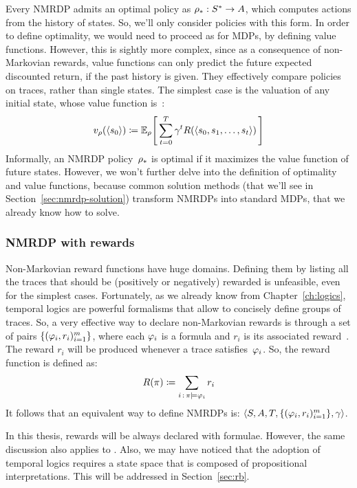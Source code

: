Every NMRDP admits an optimal policy as ${{\rho}_*: S^* \to A}$, which
computes actions from the history of states. So, we'll only consider policies
with this form. In order to define optimality, we would need to proceed as for
MDPs, by defining value functions. However, this is sightly more complex,
since as a consequence of non-Markovian rewards, value functions can
only predict the future expected discounted return, if the past history is
given. They effectively compare policies on traces, rather than single
states. The simplest case is the valuation of any initial state, whose value
function is~\cite{bib:nmrdp-logic-first}:
\begin{equation}
	v_{\rho}(\langle s_0 \rangle) \coloneqq \mathbb{E}_{\rho} \Biggl[\,
		\sum_{t=0}^{T} \gamma^t R(\langle s_0, s_1, \dots, s_t \rangle)
		\,\Biggr]
\end{equation}
Informally, an NMRDP policy~${\rho}_*$ is optimal if it maximizes the
value function of future states. However, we won't further delve into the
definition of optimality and value functions, because common solution methods
(that we'll see in Section~\ref{sec:nmrdp-solution}) transform NMRDPs into
standard MDPs, that we already know how to solve.


\subsubsection*{NMRDP with \ldl{} rewards}

Non-Markovian reward functions have huge domains. Defining them by listing all
the traces that should be (positively or negatively) rewarded is unfeasible,
even for the simplest cases. Fortunately, as we already know from
Chapter~\ref{ch:logics}, temporal logics are powerful formalisms that allow to
concisely define groups of traces. So, a very effective way to declare
non-Markovian rewards is through a set of pairs $\{(\varphi_i,
r_i)_{i=1}^m\}$, where each $\varphi_i$ is a \ldl{} formula and $r_i$ is its
associated reward~\cite{bib:degiacomo-logic-nmrdp}. The reward $r_i$ will be
produced whenever a trace satisfies~$\varphi_i$. So, the reward function is
defined as:
\begin{equation}
	R(\pi) \coloneqq \sum_{i \,:\, \pi \models \varphi_i} r_i
	\label{eq:ldlf-rewards}
\end{equation}
It follows that an equivalent way to define NMRDPs is: $\langle S, A, T,
\{(\varphi_i, r_i)_{i=1}^m\}, \gamma \rangle$.

In this thesis, rewards will be always declared with \ldl{} formulae. However,
the same discussion also applies to \ltl{}. Also, we may have noticed that the
adoption of temporal logics requires a state space that is composed of
propositional interpretations. This will be addressed in Section~\ref{sec:rb}.


